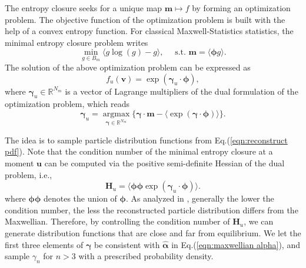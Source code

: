 \documentclass[preprint,3p,12pt,sort&compress]{elsarticle}
\begin{document}
The entropy closure seeks for a unique map $\mathbf m \mapsto f$ by forming an optimization problem.
The objective function of the optimization problem is built with the help of a convex entropy function.
For classical Maxwell-Statistics statistics, the minimal entropy closure problem writes
\begin{equation}
    \min _{g \in B_m} \langle g \log (g)-g \rangle, \quad \text { s.t. } \mathbf{m}=\langle \boldsymbol\phi g \rangle.
    \label{eqn:entropy closure}
\end{equation}
The solution of the above optimization problem can be expressed as
\begin{equation}
    f_u(\mathbf v)=\exp(\boldsymbol\gamma_u \cdot \boldsymbol\phi),
    \label{eqn:reconstruct pdf}
\end{equation}
where $\boldsymbol\gamma_u \in \mathbb R^{N_m}$ is a vector of Lagrange multipliers of the dual formulation of the optimization problem, which reads
\begin{equation}
    \boldsymbol\gamma_u = \underset{\boldsymbol\gamma \in \mathbb{R}^{N_m}}{\operatorname{argmax}}\{\boldsymbol\gamma \cdot \mathbf{m}-\langle\exp (\boldsymbol\gamma \cdot \boldsymbol\phi)\rangle\}.
\end{equation}

The idea is to sample particle distribution functions from Eq.(\ref{eqn:reconstruct pdf}).
Note that the condition number of the minimal entropy closure at a moment $\mathbf u$ can be computed via the positive semi-definite Hessian of the dual problem, i.e.,
\begin{equation}
    \mathbf H_u = \langle \boldsymbol\phi \boldsymbol\phi \exp(\boldsymbol\gamma_u \cdot \boldsymbol\phi) \rangle.
\end{equation}
where $\boldsymbol\phi \boldsymbol\phi$ denotes the union of $\boldsymbol\phi$.
As analyzed in \cite{curto1991recursiveness,junk2000maximum}, generally the lower the condition number, the less the reconstructed particle distribution differs from the Maxwellian.
Therefore, by controlling the condition number of $\mathbf H_u$, we can generate distribution functions that are close and far from equilibrium.
We let the first three elements of $\boldsymbol\gamma$ be consistent with $\hat{\boldsymbol\alpha}$ in Eq.(\ref{eqn:maxwellian alpha}), and sample $\gamma_n$ for $n>3$ with a prescribed probability density.
\end{document}
